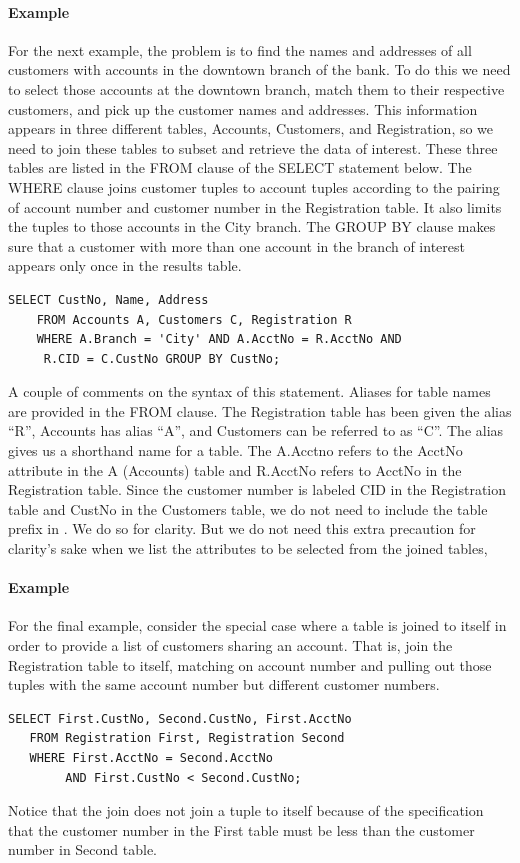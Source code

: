 \paragraph{Example}
For the next example, the problem is to find the names and addresses 
of all customers with accounts in the downtown branch of the bank.
To do this we need to select those accounts at the downtown branch, 
match them to their respective customers,
and pick up the customer names and addresses. 
This information appears in three different tables, 
Accounts, Customers, and Registration,
so we need to join these tables to subset and retrieve the data of interest. 
These three tables are listed
in the FROM clause of the SELECT statement below. 
The WHERE clause joins customer tuples to account tuples according to 
the pairing of account number and customer number in the Registration table. 
It also limits the tuples to those accounts in the City branch.  
The GROUP BY clause makes sure that a customer with more than one account
in the branch of interest appears only once in the results table.

\begin{verbatim}
SELECT CustNo, Name, Address 
    FROM Accounts A, Customers C, Registration R 
    WHERE A.Branch = 'City' AND A.AcctNo = R.AcctNo AND 
     R.CID = C.CustNo GROUP BY CustNo;
\end{verbatim}

A couple of comments on the syntax of this statement.
Aliases for table names are provided in the FROM clause.  
The Registration table has been given the alias ``R'', Accounts 
has alias ``A'', and Customers can be referred to as ``C''.  
The alias gives us a shorthand name for a table. 
The A.Acctno refers to the AcctNo attribute in the A (Accounts)
table and R.AcctNo refers to AcctNo in the Registration table.  
Since the customer number is labeled CID in the Registration table 
and CustNo in the Customers table, we do not need to include the
table prefix in .  We do so for clarity.
But we do not need this extra precaution
for clarity's sake when we list the attributes to be selected from
the joined tables, 


\paragraph{Example}
For the final example, consider the special case where a table is joined 
to itself in order to provide a list of customers sharing an account.
That is, join the Registration table to itself, matching on account number
and pulling out those tuples with the same account number but different
customer numbers. 
\begin{verbatim}
SELECT First.CustNo, Second.CustNo, First.AcctNo 
   FROM Registration First, Registration Second
   WHERE First.AcctNo = Second.AcctNo 
        AND First.CustNo < Second.CustNo;
\end{verbatim}
Notice that the join does not join a tuple to itself because
of the specification that the customer number in the First table
must be less than the customer number in Second table.

